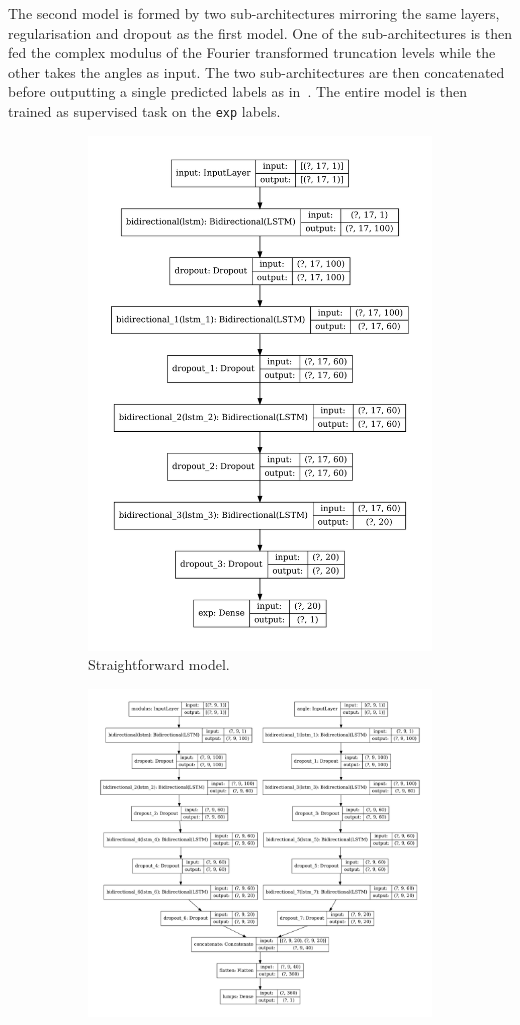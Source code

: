 The second model is formed by two sub-architectures mirroring the same layers, regularisation and dropout as the first model.
One of the sub-architectures is then fed the complex modulus of the Fourier transformed truncation levels while the other takes the angles as input.
The two sub-architectures are then concatenated before outputting a single predicted labels as in~.
The entire model is then trained as supervised task on the \texttt{exp} labels.

\begin{figure}[htbp]
  \centering
  \begin{subfigure}[b]{0.45\linewidth}
    \centering
    \includegraphics[height=0.95\linewidth]{img/lumps_ann_arch_lstm}
    \caption{Straightforward model.}
  \end{subfigure}
  \hfill
  \begin{subfigure}[b]{0.45\linewidth}
    \centering
    \includegraphics[height=0.95\linewidth]{img/lumps_ann_arch_lstm_fft}

\end{subfigure}
\end{figure}
